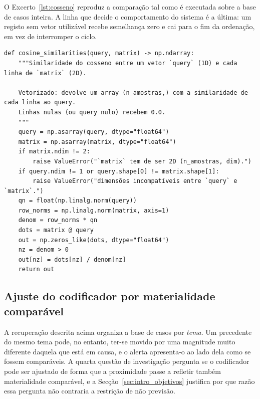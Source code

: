 O Excerto~\ref{lst:cosseno} reproduz a comparação tal como é executada sobre a base de casos inteira. A linha que decide o comportamento do sistema é a última: um registo sem vetor utilizável recebe semelhança zero e cai para o fim da ordenação, em vez de interromper o ciclo.

\begin{lstlisting}[caption={[A comparação no núcleo da recuperação]A comparação no núcleo da recuperação, vetorizada sobre a base de casos inteira. A decisão que importa é a última: um vetor nulo recebe semelhança zero em vez de levantar erro, porque um registo sem representação tem de cair para o fim da ordenação e não interromper o ciclo.}, label={lst:cosseno}, float=htbp]
def cosine_similarities(query, matrix) -> np.ndarray:
    """Similaridade do cosseno entre um vetor `query` (1D) e cada linha de `matrix` (2D).

    Vetorizado: devolve um array (n_amostras,) com a similaridade de cada linha ao query.
    Linhas nulas (ou query nulo) recebem 0.0.
    """
    query = np.asarray(query, dtype="float64")
    matrix = np.asarray(matrix, dtype="float64")
    if matrix.ndim != 2:
        raise ValueError("`matrix` tem de ser 2D (n_amostras, dim).")
    if query.ndim != 1 or query.shape[0] != matrix.shape[1]:
        raise ValueError("dimensões incompatíveis entre `query` e `matrix`.")
    qn = float(np.linalg.norm(query))
    row_norms = np.linalg.norm(matrix, axis=1)
    denom = row_norms * qn
    dots = matrix @ query
    out = np.zeros_like(dots, dtype="float64")
    nz = denom > 0
    out[nz] = dots[nz] / denom[nz]
    return out
\end{lstlisting}

\subsection{Ajuste do codificador por materialidade comparável}
\label{sec:met_qi4}

A recuperação descrita acima organiza a base de casos por \emph{tema}. Um precedente do mesmo
tema pode, no entanto, ter-se movido por uma magnitude muito diferente daquela que está em causa,
e o alerta apresenta-o ao lado dela como se fossem comparáveis. A quarta questão de investigação
pergunta se o codificador pode ser ajustado de forma que a proximidade passe a refletir também
materialidade comparável, e a Secção~\ref{sec:intro_objetivos} justifica por que razão essa
pergunta não contraria a restrição de não previsão.

